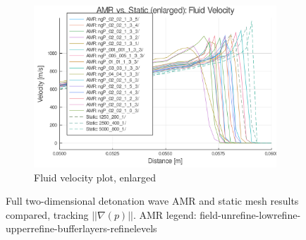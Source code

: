 \begin{figure} \ContinuedFloat


    \centering
    \begin{subfigure}[]{\textwidth}
        \centering
        \includegraphics[width=\textwidth]{./figs/amrfigs/amrcompare_all/ue.png}
        \caption{Fluid velocity plot, enlarged}
    \end{subfigure}

    \caption{Full two-dimensional detonation wave AMR and static mesh results compared, tracking \( ||\nabla(p)||\). AMR legend: field-unrefine-lowrefine-upperrefine-bufferlayers-refinelevels}
    \label{fig:amrcompare_all}
\end{figure}%
